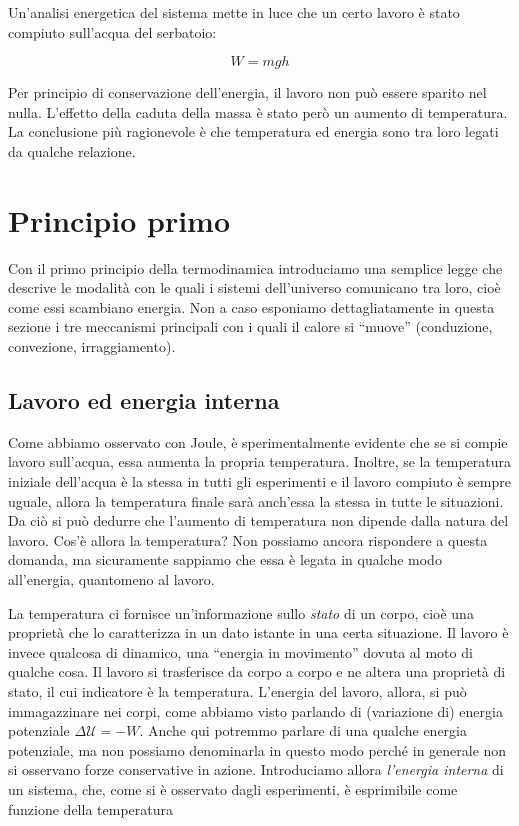 Un'analisi energetica del sistema mette in luce che un certo lavoro è
stato compiuto sull'acqua del serbatoio:

\[ W = mgh \]

\noindent Per principio di conservazione dell'energia, il lavoro non
può essere sparito nel nulla. L'effetto della caduta della massa è stato però un aumento di temperatura.
La conclusione più ragionevole è che temperatura ed energia sono tra
loro legati da qualche relazione.




\section{Principio primo}
Con il primo principio della termodinamica introduciamo una semplice
legge che descrive le modalità con le quali i sistemi dell'universo
comunicano tra loro, cioè come essi scambiano energia. Non a caso
esponiamo dettagliatamente in questa sezione i tre meccanismi
principali con i quali il calore si ``muove'' (conduzione, convezione,
irraggiamento).


\subsection{Lavoro ed energia interna}
Come abbiamo osservato con Joule, è sperimentalmente evidente che
se si compie lavoro sull'acqua, essa
aumenta la propria temperatura. Inoltre, se la temperatura iniziale
dell'acqua è la stessa in tutti gli esperimenti e il lavoro compiuto
è sempre uguale, allora la temperatura finale sarà anch'essa la stessa
in tutte le situazioni. Da ciò si può dedurre che l'aumento di
temperatura non dipende dalla natura del lavoro. Cos'è allora la
temperatura? Non possiamo ancora rispondere a questa domanda, ma
sicuramente sappiamo che essa è legata in qualche modo all'energia,
quantomeno al lavoro.

La temperatura ci fornisce un'informazione sullo \textit{stato} di
un corpo, cioè una proprietà che lo caratterizza in un dato istante
in una certa situazione. Il lavoro è invece qualcosa di dinamico,
una ``energia in movimento'' dovuta al moto di qualche cosa. Il
lavoro si trasferisce da corpo a corpo e ne altera una proprietà di
stato, il cui indicatore è la temperatura. L'energia del lavoro,
allora, si può immagazzinare nei corpi, come abbiamo visto parlando
di (variazione di) energia potenziale $\Delta\mathcal{U} = -W$.
Anche qui potremmo parlare di una qualche energia potenziale, ma
non possiamo denominarla in questo modo perché in generale non
si osservano forze conservative in azione. Introduciamo allora
\textit{l'energia interna} di un sistema, che, come si è osservato
dagli esperimenti, è esprimibile come funzione della temperatura

